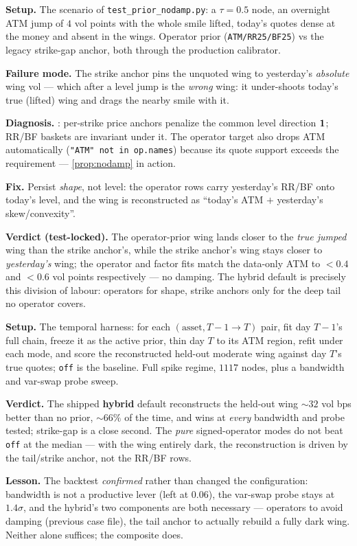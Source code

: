 \documentclass[11pt]{article}
\begin{document}
\begin{example}[title={Case file: the jump the strike anchor damped}]
\textbf{Setup.} The scenario of \texttt{test\_prior\_nodamp.py}: a
$\tau=0.5$ node, an overnight ATM jump of $4$ vol points with the whole
smile lifted, today's quotes dense at the money and absent in the wings.
Operator prior (\texttt{ATM/RR25/BF25}) vs the legacy strike-gap anchor, both
through the production calibrator.

\textbf{Failure mode.} The strike anchor pins the unquoted wing to
yesterday's \emph{absolute} wing vol --- which after a level jump is the
\emph{wrong} wing: it under-shoots today's true (lifted) wing and drags the
nearby smile with it.

\textbf{Diagnosis.} : per-strike price anchors penalize
the common level direction $\mathbf{1}$; RR/BF baskets are invariant under it. The
operator target also drops ATM automatically
(\texttt{"ATM" not in op.names}) because its quote support exceeds the
requirement --- \cref{prop:nodamp} in action.

\textbf{Fix.} Persist \emph{shape}, not level: the operator rows carry
yesterday's RR/BF onto today's level, and the wing is reconstructed as
``today's ATM $+$ yesterday's skew/convexity''.

\textbf{Verdict (test-locked).} The operator-prior wing lands closer to the
\emph{true jumped} wing than the strike anchor's, while the strike anchor's
wing stays closer to \emph{yesterday's} wing; the operator and factor fits
match the data-only ATM to $<0.4$ and $<0.6$ vol points respectively --- no
damping. The hybrid default is precisely this division of labour: operators
for shape, strike anchors only for the deep tail no operator covers.
\end{example}

\begin{example}[title={Case file: the backtest that confirmed the default}]
\textbf{Setup.} The temporal harness: for each $(\text{asset},T{-}1\to T)$
pair, fit day $T{-}1$'s full chain, freeze it as the active prior, thin day
$T$ to its ATM region, refit under each mode, and score the reconstructed
held-out moderate wing against day $T$'s true quotes; \texttt{off} is the
baseline. Full spike regime, $1117$ nodes, plus a bandwidth and var-swap
probe sweep.

\textbf{Verdict.} The shipped \textbf{hybrid} default reconstructs the
held-out wing $\sim32$ vol bps better than no prior, $\sim66\%$ of the time,
and wins at \emph{every} bandwidth and probe tested; strike-gap is a close
second. The \emph{pure} signed-operator modes do not beat \texttt{off} at
the median --- with the wing entirely dark, the reconstruction is driven by
the tail/strike anchor, not the RR/BF rows.

\textbf{Lesson.} The backtest \emph{confirmed} rather than changed the
configuration: bandwidth is not a productive lever (left at $0.06$), the
var-swap probe stays at $1.4\sigma$, and the hybrid's two components are
both necessary --- operators to avoid damping (previous case file), the tail
anchor to actually rebuild a fully dark wing. Neither alone suffices; the
composite does.
\end{example}
\end{document}
